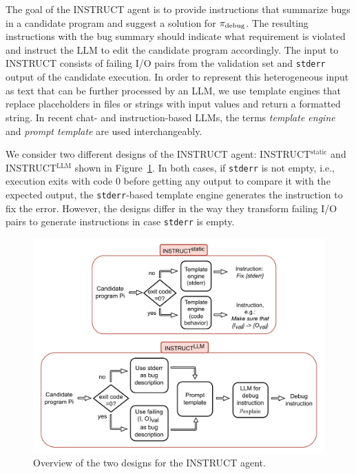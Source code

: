 The goal of the INSTRUCT agent is to provide instructions that summarize bugs in a candidate program and suggest a solution for $ \pi_\text{debug} $. 
The resulting instructions with the bug summary should indicate what requirement is violated and instruct the LLM to edit the candidate program accordingly. 
The input to INSTRUCT consists of failing I/O pairs from the validation set and \texttt{stderr} output of the candidate execution. 
In order to represent this heterogeneous input as text that can be further processed by an LLM, we use template engines that replace placeholders in files or strings with input values and return a formatted string. 
In recent chat- and instruction-based LLMs, the terms \emph{template engine} and \emph{prompt template} are used interchangeably.

We consider two different designs of the INSTRUCT agent: INSTRUCT$^{\text{static}}$ and INSTRUCT$^{\text{LLM}}$ shown in Figure~\ref{fig:method-instruct}. 
In both cases, if \texttt{stderr} is not empty, i.e., execution exits with code 0 before getting any output to compare it with the expected output, the \texttt{stderr}-based template engine generates the instruction to fix the error. 
However, the designs differ in the way they transform failing I/O pairs to generate instructions in case \texttt{stderr} is empty.

\begin{figure}
    \centering
    \includegraphics[width=\linewidth,trim={0mm 0mm 0mm 0mm}]{images/codex-for-psb-seidr-instruct-2.drawio.pdf}
    \caption{Overview of the two designs for the INSTRUCT agent.}
    \label{fig:method-instruct}
\end{figure}

